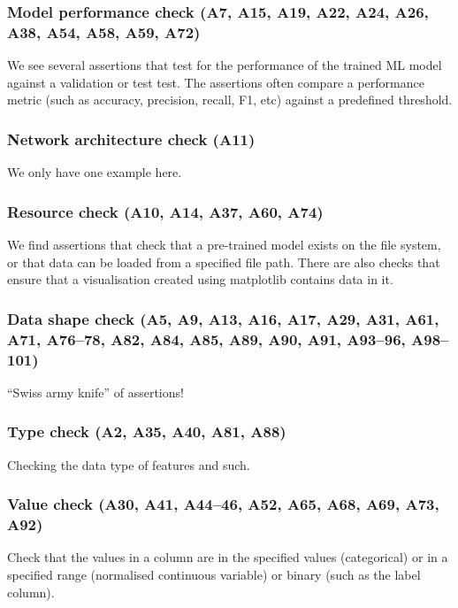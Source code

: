 \subsubsection{Model performance check (A7, A15, A19, A22, A24, A26, A38, A54, A58, A59, A72)}

We see several assertions that test for the performance of the trained ML model against a validation or test test. The assertions often compare a performance metric (such as accuracy, precision, recall, F1, etc) against a predefined threshold.

\subsubsection{Network architecture check (A11)}

We only have one example here.

\subsubsection{Resource check (A10, A14, A37, A60, A74)}

We find assertions that check that a pre-trained model exists on the file system, or that data can be loaded from a specified file path. There are also checks that ensure that a visualisation created using matplotlib contains data in it.

\subsubsection{Data shape check (A5, A9, A13, A16, A17, A29, A31, A61, A71, A76--78, A82, A84, A85, A89, A90, A91, A93--96, A98--101)}

``Swiss army knife'' of assertions!

\subsubsection{Type check (A2, A35, A40, A81, A88)}

Checking the data type of features and such.

\subsubsection{Value check (A30, A41, A44--46, A52, A65, A68, A69, A73, A92)}

Check that the values in a column are in the specified values (categorical) or in a specified range (normalised continuous variable) or binary (such as the label column).

